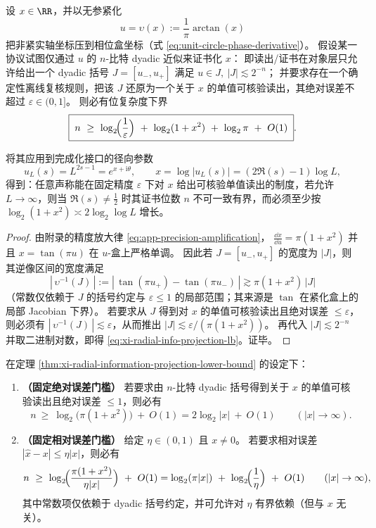 \begin{theorem}\label{thm:xi-radial-information-projection-lower-bound}
设 \(x\in\RR\)，并以无参紧化
\[
u=\upsilon(x):=\frac{1}{\pi}\arctan(x)
\]
把非紧实轴坐标压到相位盒坐标（式 \eqref{eq:unit-circle-phase-derivative}）。
假设某一协议试图仅通过 \(u\) 的 \(n\)-比特 dyadic 近似来证书化 \(x\)：
即读出/证书在对象层只允许给出一个 dyadic 括号 \(J=[u_-,u_+]\) 满足
\(
u\in J,\ |J|\lesssim 2^{-n}
\)；
并要求存在一个确定性离线复核规则，把该 \(J\) 还原为一个关于 \(x\) 的单值可核验读出，其绝对误差不超过 \(\varepsilon\in(0,1]\)。
则必有位复杂度下界
\begin{equation}\label{eq:xi-radial-info-projection-lb}
\boxed{\;
n\ \ge\ \log_2\!\Bigl(\frac{1}{\varepsilon}\Bigr)\ +\ \log_2(1+x^2)\ +\ \log_2\pi\ +\ O(1)\; }.
\end{equation}
\par
将其应用到完成化接口的径向参数
\[
u_L(s)=L^{2s-1}=e^{x+\mathrm{i}\theta},
\qquad
x=\log|u_L(s)|=(2\Re(s)-1)\log L,
\]
得到：任意声称能在固定精度 \(\varepsilon\) 下对 \(x\) 给出可核验单值读出的制度，若允许 \(L\to\infty\)，则当 \(\Re(s)\neq\tfrac12\) 时其证书位数 \(n\) 不可一致有界，而必须至少按 \(\log_2(1+x^2)\asymp 2\log_2\log L\) 增长。
\end{theorem}

\begin{proof}
由附录的精度放大律 \eqref{eq:app-precision-amplification}，
\(
\frac{\dd x}{\dd u}=\pi(1+x^2)
\)
并且 \(x=\tan(\pi u)\) 在 \(u\)-盒上严格单调。
因此若 \(J=[u_-,u_+]\) 的宽度为 \(|J|\)，则其逆像区间的宽度满足
\[
|\,\upsilon^{-1}(J)\,|
:=|\,\tan(\pi u_+)-\tan(\pi u_-)\,|
\gtrsim \pi(1+x^2)\,|J|
\]
（常数仅依赖于 \(J\) 的括号约定与 \(\varepsilon\le 1\) 的局部范围；其来源是 \(\tan\) 在紧化盒上的局部 Jacobian 下界）。
若要求从 \(J\) 得到对 \(x\) 的单值可核验读出且绝对误差 \(\le\varepsilon\)，则必须有
\(
|\,\upsilon^{-1}(J)\,|\lesssim \varepsilon
\)，从而推出
\(
|J|\lesssim \varepsilon/(\pi(1+x^2))
\)。
再代入 \(|J|\lesssim 2^{-n}\) 并取二进制对数，即得 \eqref{eq:xi-radial-info-projection-lb}。证毕。
\end{proof}

\begin{corollary}[端点紧化读出的误差门槛位预算（绝对/相对）]\label{cor:xi-radial-info-projection-thresholds}
在定理 \ref{thm:xi-radial-information-projection-lower-bound} 的设定下：
\begin{enumerate}
  \item \textbf{（固定绝对误差门槛）}
  若要求由 \(n\)-比特 dyadic 括号得到关于 \(x\) 的单值可核验读出且绝对误差 \(\le 1\)，则必有
  \[
  n\ \ge\ \log_2\!\bigl(\pi(1+x^2)\bigr)\ +\ O(1)
  =2\log_2|x|\ +\ O(1)\qquad(|x|\to\infty).
  \]
  \item \textbf{（固定相对误差门槛）}
  给定 \(\eta\in(0,1)\) 且 \(x\neq 0\)。
  若要求相对误差 \(|\widehat x-x|\le \eta|x|\)，则必有
  \[
  n\ \ge\ \log_2\!\Bigl(\frac{\pi(1+x^2)}{\eta|x|}\Bigr)\ +\ O(1)
  =\log_2(\pi|x|)\ +\ \log_2\!\Bigl(\frac{1}{\eta}\Bigr)\ +\ O(1)\qquad(|x|\to\infty),
  \]
  其中常数项仅依赖于 dyadic 括号约定，并可允许对 \(\eta\) 有界依赖（但与 \(x\) 无关）。
\end{enumerate}
\end{corollary}

